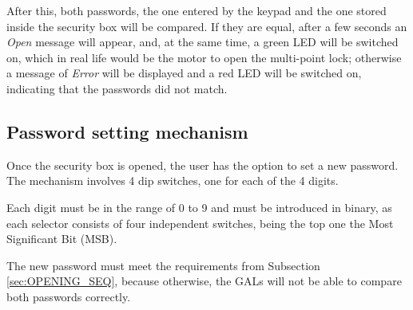 After this, both passwords, the one entered by the keypad and the one stored inside the security box will be compared. If they are equal, after a few seconds an \textit{Open} message will appear, and, at the same time, a green LED will be switched on, which in real life would be the motor to open the multi-point lock; otherwise a message of \textit{Error} will be displayed and a red LED will be switched on, indicating that the passwords did not match.

\subsection{Password setting mechanism}

Once the security box is opened, the user has the option to set a new password. The mechanism involves 4 dip switches, one for each of the 4 digits.\medskip

Each digit must be in the range of 0 to 9 and must be introduced in binary, as each selector consists of four independent switches, being the top one the Most Significant Bit (MSB).\medskip

The new password must meet the requirements from Subsection \ref{sec:OPENING_SEQ}, because otherwise, the GALs will not be able to compare both passwords correctly.


